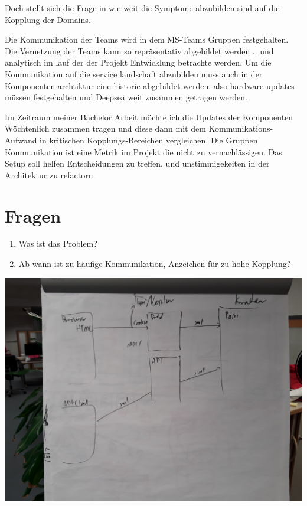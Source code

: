 \documentclass[12pt]{amsart}
\begin{document}
Doch stellt sich die Frage in wie weit die Symptome abzubilden sind auf die Kopplung der Domains. 

Die Kommunikation der Teams wird in dem MS-Teams Gruppen festgehalten. Die Vernetzung der Teams kann so repräsentativ abgebildet werden .. und analytisch im lauf der der Projekt Entwicklung betrachte werden. 
Um die Kommunikation auf die service landschaft abzubilden muss auch in der Komponenten archtiktur eine historie abgebildet werden. also hardware updates müssen festgehalten und Deepsea weit zusammen getragen werden.


\bigskip

Im Zeitraum meiner Bachelor Arbeit möchte ich die Updates der Komponenten Wöchtenlich zusammen tragen und diese dann mit dem Kommunikations-Aufwand in kritischen Kopplungs-Bereichen vergleichen. 
Die Gruppen Kommunikation ist eine Metrik im Projekt die nicht zu vernachlässigen. 
Das Setup soll helfen Entscheidungen zu treffen, und unstimmigekeiten in der Architektur zu refactorn.

\section*{{\bf Fragen}}

\medskip

\begin{enumerate}

\item Was ist das Problem?
\item Ab wann ist zu häufige Kommunikation, Anzeichen für zu hohe Kopplung?


\end{enumerate}




\medskip

\newpage

\begin{center}\includegraphics[scale = 0.14]{whith-board _1.jpg}\end{center}
\end{document}
